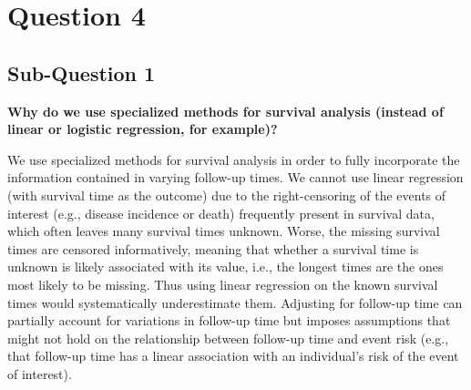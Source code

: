 \documentclass{article}\usepackage[]{graphicx}\usepackage[]{color}
\newif\ifdraft  %
\begin{document}
\pagebreak

\section*{Question 4}

\ifdraft

Answer the following questions about the Cox models estimated above: \textbf{(20 points total)}
  \begin{enumerate}
    \item Why do we use specialized methods for survival analysis (instead of linear or logistic regression, for example)? (Hint: See readings from Vittinghoff et al. 2012 text.)
    \item What are the advantages of the Cox model over other survival analysis methods? What is a potential disadvantage of the Cox model?
    \item What assumptions, if any, does the standard \textbf{Cox} proportional hazards model make?
    \item Compare the test of the smoking-mortality association between the log-rank test and the likelihood ratio test from the \ul{unadjusted} Cox proportional hazards model. What do you observe? Between these two analytic approaches, which one would you prefer, and why?
  \end{enumerate}

\fi

\subsection*{Sub-Question 1}
\textbf{Why do we use specialized methods for survival analysis (instead of linear or logistic regression, for example)?}

\vspace{2mm}

We use specialized methods for survival analysis in order to fully incorporate the information contained in varying follow-up times.  We cannot use linear regression (with survival time as the outcome) due to the right-censoring of the events of interest (e.g., disease incidence or death) frequently present in survival data, which often leaves many survival times unknown.  Worse, the missing survival times are censored informatively, meaning that whether a survival time is unknown is likely associated with its value, i.e., the longest times are the ones most likely to be missing.  Thus using linear regression on the known survival times would systematically underestimate them.  Adjusting for follow-up time can partially account for variations in follow-up time but imposes assumptions that might not hold on the relationship between follow-up time and event risk (e.g., that follow-up time has a linear association with an individual's risk of the event of interest).
\end{document}

